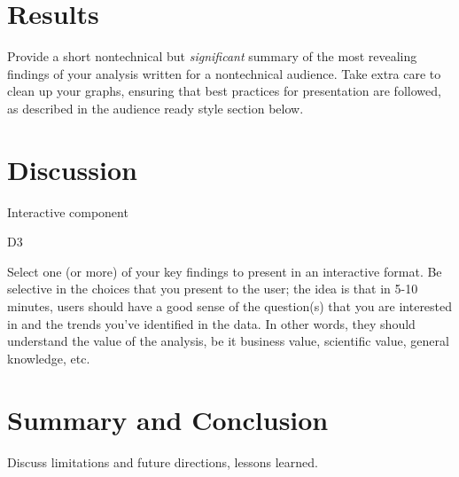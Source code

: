 \documentclass[]{book}
\begin{document}
\hypertarget{results}{%
\chapter{Results}\label{results}}

Provide a short nontechnical but \emph{significant} summary of the most revealing findings of your analysis written for a nontechnical audience. Take extra care to clean up your graphs, ensuring that best practices for presentation are followed, as described in the audience ready style section below.

\hypertarget{discussion}{%
\chapter{Discussion}\label{discussion}}

Interactive component

D3

Select one (or more) of your key findings to present in an interactive format. Be selective in the choices that you present to the user; the idea is that in 5-10 minutes, users should have a good sense of the question(s) that you are interested in and the trends you've identified in the data. In other words, they should understand the value of the analysis, be it business value, scientific value, general knowledge, etc.

\hypertarget{summary-and-conclusion}{%
\chapter{Summary and Conclusion}\label{summary-and-conclusion}}

Discuss limitations and future directions, lessons learned.


\end{document}
